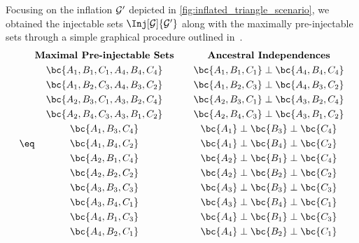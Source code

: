 \documentclass[aps, 10pt, english, twoside, pra, nofootinbib, longbibliography]{revtex4-1}
\begin{document}
    Focusing on the inflation ${\mathcal{G}}'$ depicted in \cref{fig:inflated_triangle_scenario}, we obtained the injectable sets $\Inj[\ts]{\ts'}$ along with the maximally pre-injectable sets through a simple graphical procedure outlined in~\cite{Inflation}.
    \begin{equation*}
        \eq \label{eq:pre-injectable_triangle_scenario}
        \begin{gathered}
            \textbf{Maximal Pre-injectable Sets} \\
            \bc{A_1, B_1, C_1, A_4, B_4, C_4} \\
            \bc{A_1, B_2, C_3, A_4, B_3, C_2} \\
            \bc{A_2, B_3, C_1, A_3, B_2, C_4} \\
            \bc{A_2, B_4, C_3, A_3, B_1, C_2} \\
            \bc{A_1, B_3, C_4} \\
            \bc{A_1, B_4, C_2} \\
            \bc{A_2, B_1, C_4} \\
            \bc{A_2, B_2, C_2} \\
            \bc{A_3, B_3, C_3} \\
            \bc{A_3, B_4, C_1} \\
            \bc{A_4, B_1, C_3} \\
            \bc{A_4, B_2, C_1}
        \end{gathered}
        \qquad
        \begin{gathered}
            \textbf{Ancestral Independences} \\
            \bc{A_1, B_1, C_1} \ancestralindep \bc{A_4, B_4, C_4} \\
            \bc{A_1, B_2, C_3} \ancestralindep \bc{A_4, B_3, C_2} \\
            \bc{A_2, B_3, C_1} \ancestralindep \bc{A_3, B_2, C_4} \\
            \bc{A_2, B_4, C_3} \ancestralindep \bc{A_3, B_1, C_2} \\
            \bc{A_1} \ancestralindep \bc{B_3} \ancestralindep \bc{C_4} \\
            \bc{A_1} \ancestralindep \bc{B_4} \ancestralindep \bc{C_2} \\
            \bc{A_2} \ancestralindep \bc{B_1} \ancestralindep \bc{C_4} \\
            \bc{A_2} \ancestralindep \bc{B_2} \ancestralindep \bc{C_2} \\
            \bc{A_3} \ancestralindep \bc{B_3} \ancestralindep \bc{C_3} \\
            \bc{A_3} \ancestralindep \bc{B_4} \ancestralindep \bc{C_1} \\
            \bc{A_4} \ancestralindep \bc{B_1} \ancestralindep \bc{C_3} \\
            \bc{A_4} \ancestralindep \bc{B_2} \ancestralindep \bc{C_1}
        \end{gathered}
    \end{equation*}
\end{document}
